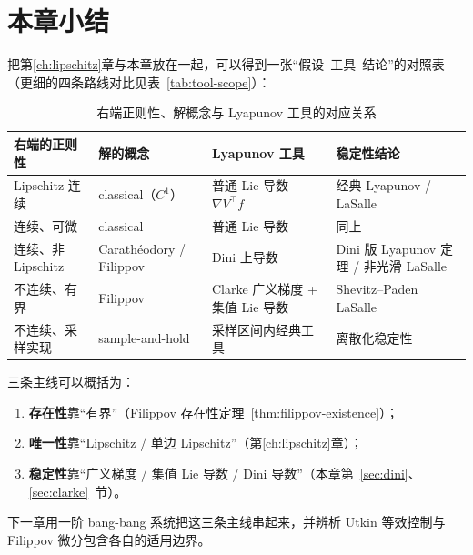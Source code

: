 \section{本章小结}\label{sec:bounded-summary}

把第\ref{ch:lipschitz}章与本章放在一起，可以得到一张“假设--工具--结论”的对照表（更细的四条路线对比见表~\ref{tab:tool-scope}）：

\begin{table}[!htb]
  \centering
  \small
  \begin{tabular}{p{3.4cm}|p{4.4cm}|p{3.4cm}|p{3.2cm}}
    \hline
    右端的正则性 & 解的概念 & Lyapunov 工具 & 稳定性结论 \\
    \hline
    Lipschitz 连续 & classical（$C^1$） & 普通 Lie 导数 $\nabla V^\top f$ & 经典 Lyapunov / LaSalle \\
    \hline
    连续、可微 & classical & 普通 Lie 导数 & 同上 \\
    \hline
    连续、非 Lipschitz & Carathéodory / Filippov & Dini 上导数 & Dini 版 Lyapunov 定理 / 非光滑 LaSalle \\
    \hline
    不连续、有界 & Filippov & Clarke 广义梯度 + 集值 Lie 导数 & Shevitz--Paden LaSalle \\
    \hline
    不连续、采样实现 & sample-and-hold & 采样区间内经典工具 & 离散化稳定性 \\
    \hline
  \end{tabular}
  \caption{右端正则性、解概念与 Lyapunov 工具的对应关系}
  \label{tab:regularity-tool-map}
\end{table}

三条主线可以概括为：
\begin{enumerate}
  \item \textbf{存在性}靠“有界”（Filippov 存在性定理~\ref{thm:filippov-existence}）；
  \item \textbf{唯一性}靠“Lipschitz / 单边 Lipschitz”（第\ref{ch:lipschitz}章）；
  \item \textbf{稳定性}靠“广义梯度 / 集值 Lie 导数 / Dini 导数”（本章第~\ref{sec:dini}、\ref{sec:clarke}~节）。
\end{enumerate}
下一章用一阶 bang-bang 系统把这三条主线串起来，并辨析 Utkin 等效控制与 Filippov 微分包含各自的适用边界。
